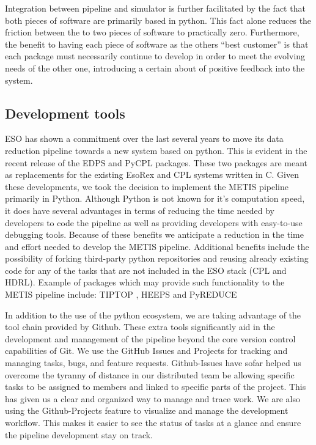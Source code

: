 \documentclass[a4paper]{spie}  %
\begin{document}
Integration between pipeline and simulator is further facilitated by the fact that both pieces of software are primarily based in python.
This fact alone reduces the friction between the to two pieces of software to practically zero.
Furthermore, the benefit to having each piece of software as the others ``best customer'' is that each package must necessarily continue to develop in order to meet the evolving needs of the other one, introducing a certain about of positive feedback into the system.


\subsection{Development tools}
\label{subsec:imp_tools}

ESO has shown a commitment over the last several years to move its data reduction pipeline towards a new system based on python. 
This is evident in the recent release of the EDPS \cite{edps} and PyCPL \cite{pycpl} packages.
These two packages are meant as replacements for the existing EsoRex and CPL systems written in C.
Given these developments, we took the decision to implement the METIS pipeline primarily in Python.
Although Python is not known for it's computation speed, it does have several advantages in terms of reducing the time needed by developers to code the pipeline as well as providing developers with easy-to-use debugging tools. 
Because of these benefits we anticipate a reduction in the time and effort needed to develop the METIS pipeline.
Additional benefits include the possibility of forking third-party python repositories and reusing already existing code for any of the tasks that are not included in the ESO stack (CPL and HDRL). 
Example of packages which may provide such functionality to the METIS pipeline include: TIPTOP \cite{tiptop}, HEEPS \cite{HEEPS} and PyREDUCE \cite{pyreduce}

In addition to the use of the python ecosystem, we are taking advantage of the tool chain provided by Github. 
These extra tools significantly aid in the development and management of the pipeline beyond the core version control capabilities of Git. 
We use the GitHub Issues and Projects for tracking and managing tasks, bugs, and feature requests. 
Github-Issues have sofar helped us overcome the tyranny of distance in our distributed team be allowing specific tasks to be assigned to members and linked to specific parts of the project. 
This has given us a clear and organized way to manage and trace work. 
We are also using the Github-Projects feature to visualize and manage the development workflow. 
This makes it easier to see the status of tasks at a glance and ensure the pipeline development stay on track.
\end{document}
